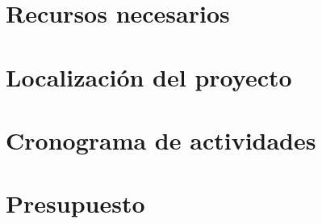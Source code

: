 \documentclass[12pt,a4paper]{article}
\newcommand{\newsection}[1]{\section{\hspace{4mm} #1}}%
\begin{document}
\newpage
\newsection{Recursos necesarios }
\lipsum[1] %

\newpage
\newsection{Localización del proyecto }
\lipsum[1] %



\newpage
\newsection{Cronograma de actividades}
\lipsum[1]

\newpage
\newsection{Presupuesto}
\lipsum[1]
    
\end{document}
